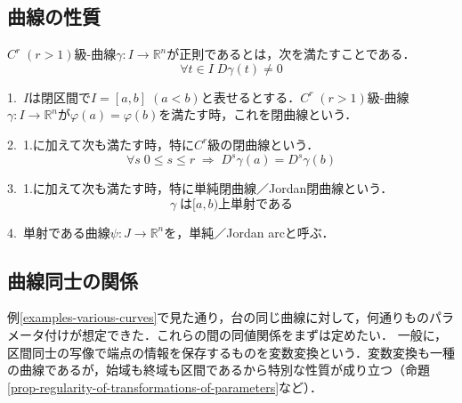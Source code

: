 \documentclass[uplatex, 12pt, dvipdfmx]{jsarticle}
\begin{document}
\subsection{曲線の性質}

\begin{definition}
    $C^r\;(r>1)$級-曲線$\gamma:I\to\mathbb{R}^n$が正則であるとは，次を満たすことである．
    \[ \forall t\in I\; D\gamma(t)\ne 0 \]
\end{definition}

\begin{definition}[閉曲線]\rm{}

    1.\, $I$は閉区間で$I=[a,b]\;(a<b)$と表せるとする．$C^r\;(r>1)$級-曲線$\gamma:I\to\mathbb{R}^n$が$\varphi(a)=\varphi(b)$を満たす時，これを閉曲線という．

    2.\, 1.に加えて次も満たす時，特に$C^r$級の閉曲線という．
    \[ \forall s \; 0\le s\le r \;\Rightarrow\; D^s\gamma(a)=D^s\gamma(b) \]

    3.\, 1.に加えて次も満たす時，特に単純閉曲線／Jordan閉曲線という．
    \[ \gamma\; は[a,b)上単射である \]

    4.\, 単射である曲線$\psi:J\to\mathbb{R}^n$を，単純／Jordan arcと呼ぶ．
\end{definition}

\begin{definition}[長さ]
    
\end{definition}

\subsection{曲線同士の関係}
例\ref{examples-various-curves}で見た通り，台の同じ曲線に対して，何通りものパラメータ付けが想定できた．これらの間の同値関係をまずは定めたい．
一般に，区間同士の写像で端点の情報を保存するものを変数変換という．変数変換も一種の曲線であるが，始域も終域も区間であるから特別な性質が成り立つ（命題\ref{prop-regularity-of-transformations-of-parameters}など）．
\end{document}
